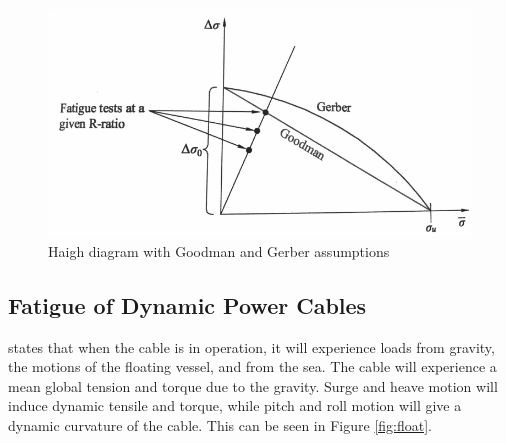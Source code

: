 \begin{figure}[H]
\centering
\includegraphics[scale=0.6]{figures/gerber}
\caption[$\; \:$Haigh diagram with Goodman and Gerber assumptions]{Haigh diagram with Goodman and Gerber assumptions \cite{Savik2016} }
 \label{fig:gerber}
\end{figure}

\subsection{Fatigue of Dynamic Power Cables}
\noindent \cite{Nasution2013} states that when the cable is in operation, it will experience loads from gravity, the motions of the floating vessel, and from the sea. The cable will experience a mean global tension and torque due to the gravity. Surge and heave motion will induce dynamic tensile and torque, while pitch and roll motion will give a dynamic curvature of the cable. This can be seen in Figure \ref{fig:float}. 

